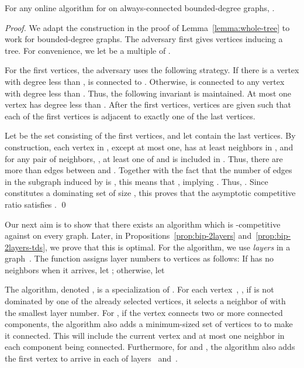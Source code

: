 \begin{proposition}
For any online algorithm \ALG for \ds on always-connected
bounded-degree graphs, .
\end{proposition}

\begin{proof}
We adapt the construction in the proof of
Lemma~\ref{lemma:whole-tree} to work for bounded-degree graphs. 
The adversary first gives  vertices inducing a tree.
For convenience, we let  be a multiple of .


For the first  vertices, the adversary uses the following
strategy.
If there is a vertex  with degree less than
,  is connected to .
Otherwise,  is connected to any vertex  with degree less than
.
Thus, the following invariant is maintained.
At most one vertex  has degree less than .
After the first  vertices,  vertices are given such
that each of the first  vertices is adjacent to exactly one of
the last  vertices.

Let  be the set consisting of the first  vertices, and let
 contain the last  vertices.
By construction, each vertex in , except at most one, has at least  neighbors in
, and for any pair of neighbors, , at least
one of  and  is included in .
Thus, there are more than  edges
between  and .
Together with the fact that the number of edges in the subgraph induced
by  is ,
this means that ,
implying .
Thus, .
Since  constitutes a dominating set of size , this proves that
the asymptotic competitive ratio satisfies 
.
\qed\end{proof}


Our next aim is to show that there exists an algorithm which is
-competitive against  on every graph.
Later, in Propositions~\ref{prop:bip-2layers} and~\ref{prop:bip-2layers-tds}, we prove that this is optimal.
For the algorithm, we use \emph{layers} in a graph~.
The function  assigns layer numbers to vertices as follows:
If  has no neighbors when it arrives, let ; otherwise, let


The
algorithm, denoted \alayersparent, is a specialization of \aparent.
For each vertex~, ,
if  is not dominated by one of the already selected
vertices, it selects a neighbor of  with the smallest
layer number. 
For \cds, if the vertex 
connects two or more connected components, the algorithm also adds a
minimum-sized set of 
vertices to  to make it connected. This will include the current
vertex and at most one neighbor in each component being connected.
Furthermore, for \ds and \cds, the algorithm also adds the first
vertex to arrive in each of layers~ and~.

